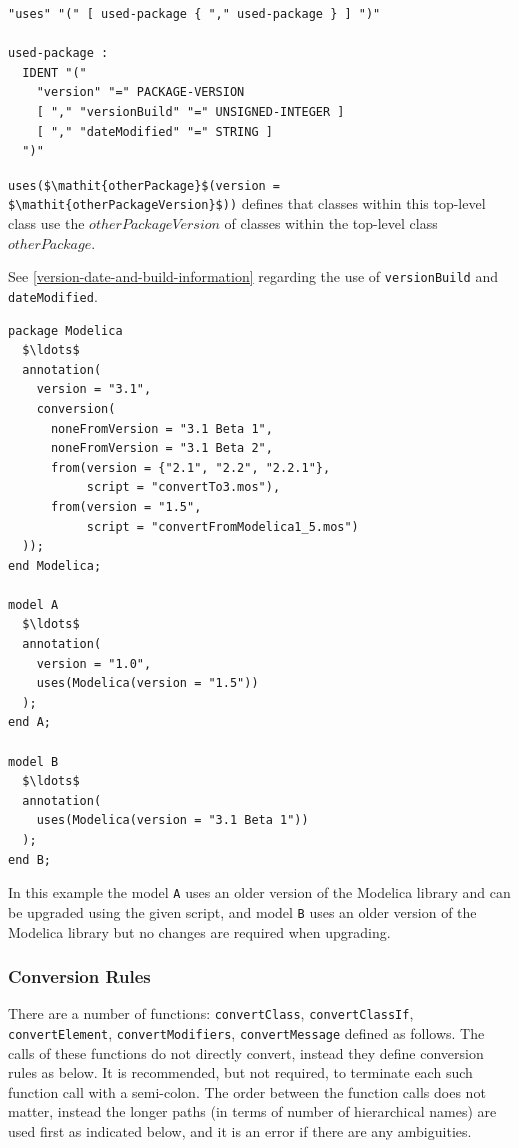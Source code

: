 \begin{annotationdefinition}[uses]
\begin{synopsis}[grammar]\begin{lstlisting}
"uses" "(" [ used-package { "," used-package } ] ")"

used-package :
  IDENT "("
    "version" "=" PACKAGE-VERSION
    [ "," "versionBuild" "=" UNSIGNED-INTEGER ]
    [ "," "dateModified" "=" STRING ]
  ")"
\end{lstlisting}\end{synopsis}
\begin{semantics}
\lstinline!uses($\mathit{otherPackage}$(version = $\mathit{otherPackageVersion}$))! defines that classes within this top-level class use the $\mathit{otherPackageVersion}$ of classes within the top-level class $\mathit{otherPackage}$.

See \cref{version-date-and-build-information} regarding the use of \lstinline!versionBuild! and \lstinline!dateModified!.
\end{semantics}
\end{annotationdefinition}

\begin{example}
\begin{lstlisting}[language=modelica]
package Modelica
  $\ldots$
  annotation(
    version = "3.1",
    conversion(
      noneFromVersion = "3.1 Beta 1",
      noneFromVersion = "3.1 Beta 2",
      from(version = {"2.1", "2.2", "2.2.1"},
           script = "convertTo3.mos"),
      from(version = "1.5",
           script = "convertFromModelica1_5.mos")
  ));
end Modelica;

model A
  $\ldots$
  annotation(
    version = "1.0",
    uses(Modelica(version = "1.5"))
  );
end A;

model B
  $\ldots$
  annotation(
    uses(Modelica(version = "3.1 Beta 1"))
  );
end B;
\end{lstlisting}
In this example the model \lstinline!A! uses an older version of the Modelica library and can be upgraded using the given script, and model \lstinline!B! uses an older version of the Modelica library but no changes are required when upgrading.
\end{example}


\subsubsection{Conversion Rules}\label{conversion-rules}

There are a number of functions: \lstinline!convertClass!, \lstinline!convertClassIf!, \lstinline!convertElement!, \mbox{\lstinline!convertModifiers!,} \lstinline!convertMessage! defined as follows.
The calls of these functions do not directly convert, instead they define conversion rules as below.
It is recommended, but not required, to terminate each such function call with a semi-colon.
The order between the function calls does not matter, instead the longer paths (in terms of number of hierarchical names) are used first as indicated below, and it is an error if there are any ambiguities.

